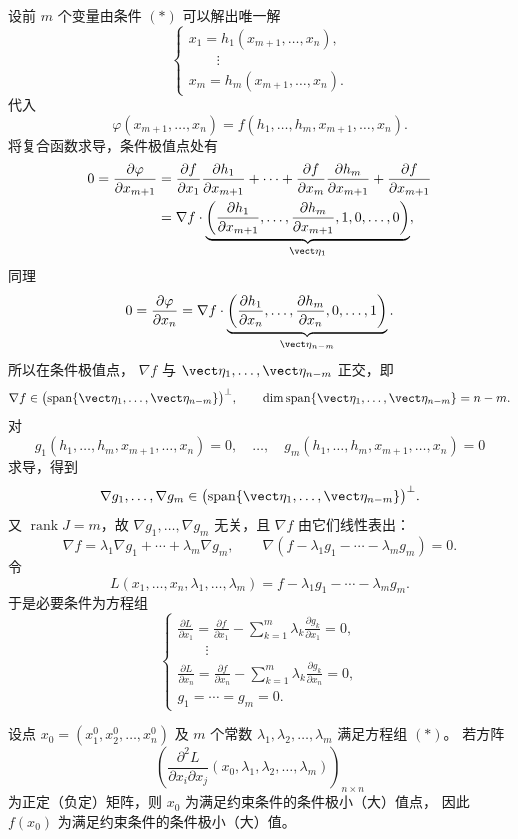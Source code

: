 设前 $m$ 个变量由条件 $(*)$ 可以解出唯一解
\[
\begin{cases}
x_1=h_1(x_{m+1},\ldots,x_n),\\
\qquad\vdots\\
x_m=h_m(x_{m+1},\ldots,x_n).
\end{cases}
\]
代入
\[
\varphi(x_{m+1},\ldots,x_n)
=f(h_1,\ldots,h_m,x_{m+1},\ldots,x_n).
\]
将复合函数求导，条件极值点处有
\[
\begin{aligned}
0=\frac{\partial\varphi}{\partial x_{m+1}}
&=\frac{\partial f}{\partial x_1}
\frac{\partial h_1}{\partial x_{m+1}}
+\cdots+
\frac{\partial f}{\partial x_m}
\frac{\partial h_m}{\partial x_{m+1}}
+\frac{\partial f}{\partial x_{m+1}}\\
&=\nabla f\cdot
\underbrace{\left(
\frac{\partial h_1}{\partial x_{m+1}},
\ldots,
\frac{\partial h_m}{\partial x_{m+1}},
1,0,\ldots,0
\right)}_{\vect\eta_1},
\end{aligned}
\]
同理
\[
0=\frac{\partial\varphi}{\partial x_n}
=\nabla f\cdot
\underbrace{\left(
\frac{\partial h_1}{\partial x_n},
\ldots,
\frac{\partial h_m}{\partial x_n},
0,\ldots,1
\right)}_{\vect\eta_{n-m}}.
\]
所以在条件极值点，
$\nabla f$ 与 $\vect\eta_1,\ldots,\vect\eta_{n-m}$ 正交，即
\[
\nabla f\in
\bigl(\operatorname{span}\{\vect\eta_1,\ldots,\vect\eta_{n-m}\}\bigr)^\perp,
\qquad
\dim\operatorname{span}\{\vect\eta_1,\ldots,\vect\eta_{n-m}\}=n-m.
\]
对
\[
g_1(h_1,\ldots,h_m,x_{m+1},\ldots,x_n)=0,\quad
\ldots,\quad
g_m(h_1,\ldots,h_m,x_{m+1},\ldots,x_n)=0
\]
求导，得到
\[
\nabla g_1,\ldots,\nabla g_m
\in
\bigl(\operatorname{span}\{\vect\eta_1,\ldots,\vect\eta_{n-m}\}\bigr)^\perp.
\]
又 $\operatorname{rank}J=m$，故
$\nabla g_1,\ldots,\nabla g_m$ 无关，且
$\nabla f$ 由它们线性表出：
\[
\nabla f=\lambda_1\nabla g_1+\cdots+\lambda_m\nabla g_m,
\qquad
\nabla(f-\lambda_1g_1-\cdots-\lambda_mg_m)=0.
\]
令
\[
L(x_1,\ldots,x_n,\lambda_1,\ldots,\lambda_m)
=f-\lambda_1g_1-\cdots-\lambda_mg_m.
\]
于是必要条件为方程组
\[
\begin{cases}
\displaystyle\frac{\partial L}{\partial x_1}
=\frac{\partial f}{\partial x_1}
-\sum_{k=1}^m\lambda_k\frac{\partial g_k}{\partial x_1}=0,\\
\qquad\vdots\\
\displaystyle\frac{\partial L}{\partial x_n}
=\frac{\partial f}{\partial x_n}
-\sum_{k=1}^m\lambda_k\frac{\partial g_k}{\partial x_n}=0,\\
g_1=\cdots=g_m=0.
\end{cases}\tag{*}
\]

\begin{theorem}
设点 $x_0=(x_1^0,x_2^0,\ldots,x_n^0)$ 及 $m$ 个常数
$\lambda_1,\lambda_2,\ldots,\lambda_m$ 满足方程组 $(*)$。
若方阵
\[
\left(
\frac{\partial^2L}{\partial x_i\partial x_j}
(x_0,\lambda_1,\lambda_2,\ldots,\lambda_m)
\right)_{n\times n}
\]
为正定（负定）矩阵，则 $x_0$ 为满足约束条件的条件极小（大）值点，
因此 $f(x_0)$ 为满足约束条件的条件极小（大）值。
\end{theorem}

